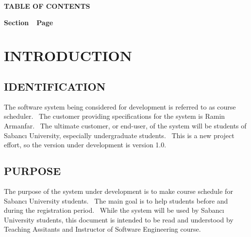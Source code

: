 \documentclass[twoside,letterpaper]{article}
\begin{document}

{\centering{}\bfseries\color{black}
TABLE OF CONTENTS
\par}


\bigskip

{\bfseries\color{black}
Section\ \ Page}

\setcounter{tocdepth}{9}
\renewcommand\contentsname{}
\tableofcontents

\bigskip

\clearpage\clearpage\setcounter{page}{1}\pagestyle{Standard}
\section[INTRODUCTION]{\rmfamily\bfseries\color{black}
INTRODUCTION}

\subsection[IDENTIFICATION]{\rmfamily\bfseries\color{black}
IDENTIFICATION}

{\color{black}
\begin{flushleft}The software system being considered for development is referred to as course scheduler. \ The customer providing specifications
for the system is Ramin Armanfar. \ The ultimate
customer, or end-user, of the system will be students of Sabanc{\i}  University, especially undergraduate students. \ This is a new project effort, so the
version under development is version 1.0.\end{flushleft}}

\subsection[PURPOSE]{\rmfamily\bfseries\color{black}
PURPOSE}

{\color{black}
\begin{flushleft}The purpose of the system under development is to make course schedule for Sabanc\i{} University students. \ The main goal is to help students before and during the registration period. \ While the system will be used by Sabanc{\i} University students,
this document is intended to be read and understood by Teaching Assitants and Instructor of Software Engineering course.\end{flushleft}}
\end{document}
